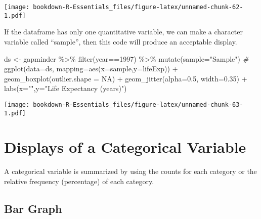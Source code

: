 \documentclass[
]{book}
\newenvironment{Shaded}{\begin{snugshade}}{\end{snugshade}}
\newcommand{\AttributeTok}[1]{\textcolor[rgb]{0.77,0.63,0.00}{#1}}
\newcommand{\CommentTok}[1]{\textcolor[rgb]{0.56,0.35,0.01}{\textit{#1}}}
\newcommand{\ConstantTok}[1]{\textcolor[rgb]{0.00,0.00,0.00}{#1}}
\newcommand{\DecValTok}[1]{\textcolor[rgb]{0.00,0.00,0.81}{#1}}
\newcommand{\FloatTok}[1]{\textcolor[rgb]{0.00,0.00,0.81}{#1}}
\newcommand{\FunctionTok}[1]{\textcolor[rgb]{0.00,0.00,0.00}{#1}}
\newcommand{\NormalTok}[1]{#1}
\newcommand{\OtherTok}[1]{\textcolor[rgb]{0.56,0.35,0.01}{#1}}
\newcommand{\SpecialCharTok}[1]{\textcolor[rgb]{0.00,0.00,0.00}{#1}}
\newcommand{\StringTok}[1]{\textcolor[rgb]{0.31,0.60,0.02}{#1}}
\begin{document}
\texttt{[image: bookdown-R-Essentials\_files/figure-latex/unnamed-chunk-62-1.pdf]}

If the dataframe has only one quantitative variable, we can make a character variable called ``sample'', then this code will produce an acceptable display.

\begin{Shaded}
\begin{Highlighting}[]
\NormalTok{ds }\OtherTok{\textless{}{-}}\NormalTok{ gapminder }\SpecialCharTok{\%\textgreater{}\%} 
  \FunctionTok{filter}\NormalTok{(year}\SpecialCharTok{==}\DecValTok{1997}\NormalTok{) }\SpecialCharTok{\%\textgreater{}\%}
  \FunctionTok{mutate}\NormalTok{(}\AttributeTok{sample=}\StringTok{"Sample"}\NormalTok{)}
\CommentTok{\#}
\FunctionTok{ggplot}\NormalTok{(}\AttributeTok{data=}\NormalTok{ds, }\AttributeTok{mapping=}\FunctionTok{aes}\NormalTok{(}\AttributeTok{x=}\NormalTok{sample,}\AttributeTok{y=}\NormalTok{lifeExp)) }\SpecialCharTok{+}
 \FunctionTok{geom\_boxplot}\NormalTok{(}\AttributeTok{outlier.shape =} \ConstantTok{NA}\NormalTok{) }\SpecialCharTok{+} 
 \FunctionTok{geom\_jitter}\NormalTok{(}\AttributeTok{alpha=}\FloatTok{0.5}\NormalTok{, }\AttributeTok{width=}\FloatTok{0.35}\NormalTok{) }\SpecialCharTok{+}
  \FunctionTok{labs}\NormalTok{(}\AttributeTok{x=}\StringTok{""}\NormalTok{,}\AttributeTok{y=}\StringTok{"Life Expectancy (years)"}\NormalTok{)}
\end{Highlighting}
\end{Shaded}

\texttt{[image: bookdown-R-Essentials\_files/figure-latex/unnamed-chunk-63-1.pdf]}

\hypertarget{displays-of-a-categorical-variable}{%
\section{Displays of a Categorical Variable}\label{displays-of-a-categorical-variable}}

A categorical variable is summarized by using the counts for each category or the relative frequency (percentage) of each category.

\hypertarget{bar-graph}{%
\subsection{Bar Graph}\label{bar-graph}}
\end{document}
